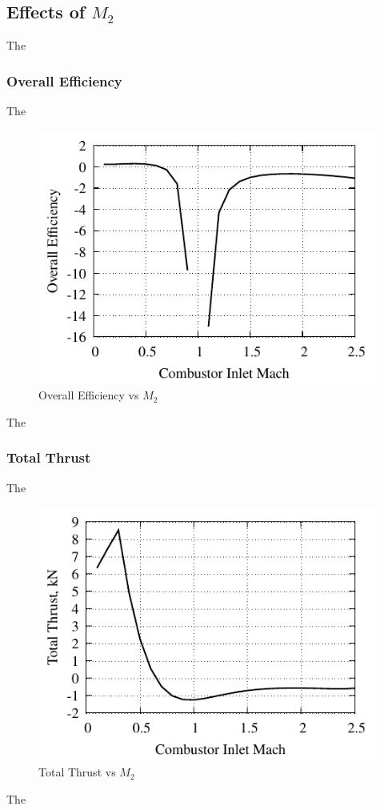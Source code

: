 \documentclass[conf]{new-aiaa} %
\begin{document}
\subsection{Effects of \texorpdfstring{$M_2$}{M2}} %
The

\subsubsection{Overall Efficiency}
The

\begin{figure}[H] %
    \centering
    \includegraphics[]{media/performance_parameter_files/part_h_eta_o.pdf}
    \caption{\label{fig:parthetao}Overall Efficiency vs \texorpdfstring{\textit{$M_2$}}{M2}}
\end{figure}
The

\subsubsection{Total Thrust}
The

\begin{figure}[H] %
    \centering
    \includegraphics[]{media/performance_parameter_files/part_h_T.pdf}
    \caption{\label{fig:partht}Total Thrust vs \texorpdfstring{\textit{$M_2$}}{M2}}
\end{figure}
The
\end{document}
